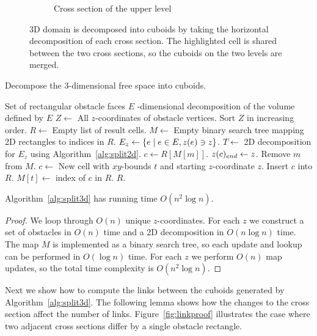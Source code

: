 \documentclass[english,gradu]{tktltiki2018}
\begin{document}
\begin{figure}
\begin{subfigure}[t]{0.3\textwidth}
		\caption{Cross section of the upper level}
	\end{subfigure}
	\caption{3D domain is decomposed into cuboids by taking the horizontal decomposition of each cross section. The highlighted cell is shared between the two cross sections, so the cuboids on the two levels are merged.}\label{fig:split3d}
\end{figure}

\begin{algorithm}
\caption{Decompose the 3-dimensional free space into cuboids.}\label{alg:split3d}
\begin{algorithmic}
\Require Set of rectangular obstacle faces $E$
-dimensional decomposition of the volume defined by $E$
\State $Z\gets$ All $z$-coordinates of obstacle vertices.
\State Sort $Z$ in increasing order.
\State $R\gets$ Empty list of result cells.
\State $M\gets$ Empty binary search tree mapping 2D rectangles to indices in $R$.
	\State $E_z\gets\left\{e \mid e\in E, z(e)\ni z\right\}$.
	\State $T\gets$ 2D decomposition for $E_z$ using Algorithm~\ref{alg:split2d}.
		\State $c\gets R[M[m]]$.
		\State $z(c)_{end}\gets z$.
		\State Remove $m$ from $M$.
	\EndFor
		\State $c\gets$ New cell with $xy$-bounds $t$ and starting $z$-coordinate $z$.
		\State Insert $c$ into $R$.
		\State $M[t]\gets$ index of $c$ in $R$.
	\EndFor
\EndFor
\State \Return $R$.
\end{algorithmic}
\end{algorithm}

\begin{lem}\label{lem:split3dtime}Algorithm~\ref{alg:split3d} has running time $O(n^2\log n)$.\end{lem}
\begin{proof}
We loop through $O(n)$ unique $z$-coordinates.
For each $z$ we construct a set of obstacles in $O(n)$ time and a 2D decomposition in $O(n\log n)$ time.
The map $M$ is implemented as a binary search tree, so each update and lookup can be performed in $O(\log n)$ time.
For each $z$ we perform $O(n)$ map updates, so the total time complexity is $O(n^2\log n)$.
\end{proof}

Next we show how to compute the links between the cuboids generated by Algorithm~\ref{alg:split3d}.
The following lemma shows how the changes to the cross section affect the number of links.
Figure~\ref{fig:linkproof} illustrates the case where two adjacent cross sections differ by a single obstacle rectangle.
\end{document}

